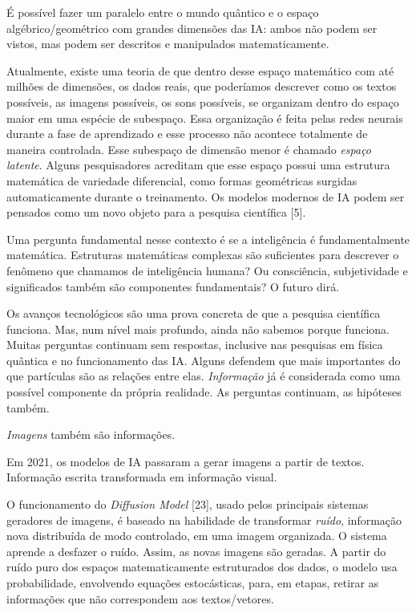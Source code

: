 \documentclass{hipatia}
\begin{document}
É possível fazer um paralelo entre o mundo quântico e o espaço algébrico/geométrico com grandes dimensões das IA: ambos não podem ser vistos, mas podem ser descritos e manipulados matematicamente.

Atualmente, existe uma teoria de que dentro desse espaço matemático com até milhões de dimensões, os dados reais, que poderíamos descrever como os textos possíveis, as imagens possíveis, os sons possíveis, se organizam dentro do espaço maior em uma espécie de subespaço. Essa organização é feita pelas redes neurais durante a fase de aprendizado e esse processo não acontece totalmente de maneira controlada. Esse subespaço de dimensão menor é chamado \textit{espaço latente}. Alguns pesquisadores acreditam que esse espaço possui uma estrutura matemática de variedade diferencial, como formas geométricas surgidas automaticamente durante o treinamento. Os modelos modernos de IA podem ser pensados como um novo objeto para a pesquisa científica [5].

Uma pergunta fundamental nesse contexto é se a inteligência é fundamentalmente matemática. Estruturas matemáticas complexas são suficientes para descrever o fenômeno que chamamos de inteligência humana? Ou consciência, subjetividade e significados também são componentes fundamentais? O futuro dirá.

Os avanços tecnológicos são uma prova concreta de que a pesquisa científica funciona. Mas, num nível mais profundo, ainda não sabemos porque funciona. Muitas perguntas continuam sem respostas, inclusive nas pesquisas em física quântica e no funcionamento das IA.  Alguns defendem que mais importantes do que partículas são as relações entre elas. \textit{Informação} já é considerada como uma possível componente da própria realidade. As perguntas continuam, as hipóteses também.

\textit{Imagens} também são informações.

Em 2021, os modelos de IA passaram a gerar imagens a partir de textos. Informação escrita transformada em informação visual.

O funcionamento do \textit{Diffusion Model} 	[23], usado pelos principais sistemas geradores de imagens, é baseado na habilidade de transformar \textit{ruído}, informação nova distribuída de modo controlado, em uma imagem organizada. O sistema aprende a desfazer o ruído. Assim, as novas imagens são geradas. A partir do ruído puro dos espaços matematicamente estruturados dos dados, o modelo usa probabilidade, envolvendo equações estocásticas, para, em etapas, retirar as informações que não correspondem aos textos/vetores.
\end{document}
